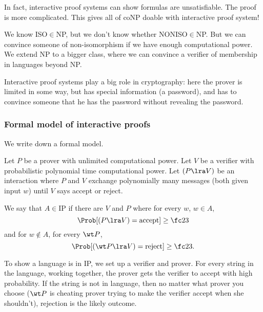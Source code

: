 In fact, interactive proof systems can show formulas are unsatisfiable. The proof is more complicated. This gives all of coNP doable with interactive proof system!

We know ISO$\in$NP, but we don't know whether NONISO$\in$NP. But we can convince someone of non-isomorphism if we have enough computational power. We extend NP to a bigger class, where we can convince a verifier of membership in languages beyond NP.


Interactive proof systems play a big role in cryptography: here the prover is limited in some way, but has special information (a password), and has to convince someone that he has the password without revealing the password.

\subsubsection{Formal model of interactive proofs}
We write down a formal model.

\begin{df}
Let $P$ be a prover with unlimited computational power. Let $V$ be a verifier with probabilistic polynomial time computational power.
Let $(P\lra V)$ be an interaction where $P$ and $V$ exchange polynomially many messages (both given input $w$) until $V$ says accept or reject.

We say that $A\in$IP if there are $V$ and $P$ where for every $w$, $w\in A$, 
\[
\Prob[(P\lra V)=\text{accept}]\ge \fc 23
\]
and for $w\nin A$, for every $\wt P$,
\[
\Prob[(\wt P\lra V)=\text{reject}]\ge \fc 23.
\]
\end{df}
To show a language is in IP, we set up a verifier and prover. For every string in the language, working together, the prover gets the verifier to accept with high probability. If the string is not in language, then no matter what prover you choose ($\wt P$ is cheating prover trying to make the verifier accept when she shouldn't), rejection is the likely outcome.

